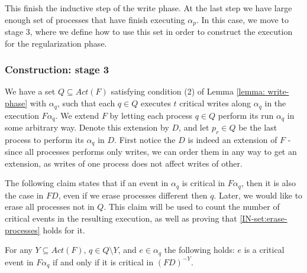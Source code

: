 This finish the inductive step of the write phase. At the last step we have large enough set of processes that have finish executing $\alpha_p$. In this case, we move to stage 3, where we define how to use this set in order to construct the execution for the regularization phase.



\subsubsection{Construction: stage 3}

We have a set $Q \subseteq Act(F)$ satisfying condition (2) of Lemma \ref{lemma: write-phase} with $\alpha_q$, such that each $q \in Q$ executes $t$ critical writes along $\alpha_q$ in the execution $F \alpha_q$.
We extend $F$ by letting each process $q \in Q$ perform its run $\alpha_q$ in some arbitrary way. Denote this extension by $D$, and let $p_r \in Q$ be the last process to perform its $\alpha_q$ in $D$. First notice the $D$ is indeed an extension of $F$ - since all processes performs only writes, we can order them in any way to get an extension, as writes of one process does not affect writes of other.

The following claim states that if an event in $\alpha_q$ is critical in $F \alpha_q$, then it is also the case in $F D$, even if we erase processes different then $q$. Later, we would like to erase all processes not in $Q$. This claim will be used to count the number of critical events in the resulting execution, as well as proving that \ref{IN-set:erase-processes} holds for it.

\begin{claim-subsection} \label{claim: write-phase-erase}
	For any $Y \subseteq Act(F)$, $q \in Q \setminus Y$, and $e \in \alpha_q$ the following holds:
	$e$ is a critical event in $F \alpha_q$ if and only if it is critical in $(F D)^{-Y}$.
\end{claim-subsection}

